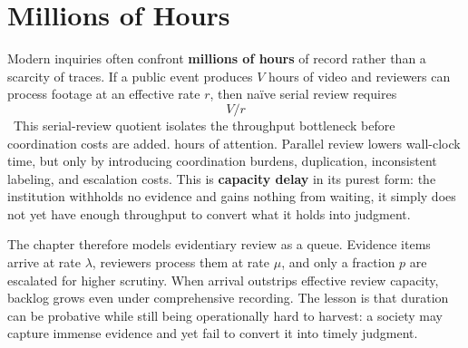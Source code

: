 
\chapter{Millions of Hours}
\label{ch:ch018}

Modern inquiries often confront \textbf{millions of hours} of record rather than a scarcity of traces. If a public event produces \(V\) hours of video and reviewers can process footage at an effective rate \(r\), then naïve serial review requires
\[
V/r
\]
\ToyModel\ This serial-review quotient isolates the throughput bottleneck before coordination costs are added.
hours of attention. Parallel review lowers wall-clock time, but only by introducing coordination burdens, duplication, inconsistent labeling, and escalation costs. This is \textbf{capacity delay} in its purest form: the institution withholds no evidence and gains nothing from waiting, it simply does not yet have enough throughput to convert what it holds into judgment.

The chapter therefore models evidentiary review as a queue. Evidence items arrive at rate \(\lambda\), reviewers process them at rate \(\mu\), and only a fraction \(p\) are escalated for higher scrutiny. When arrival outstrips effective review capacity, backlog grows even under comprehensive recording. The lesson is that duration can be probative while still being operationally hard to harvest: a society may capture immense evidence and yet fail to convert it into timely judgment.
